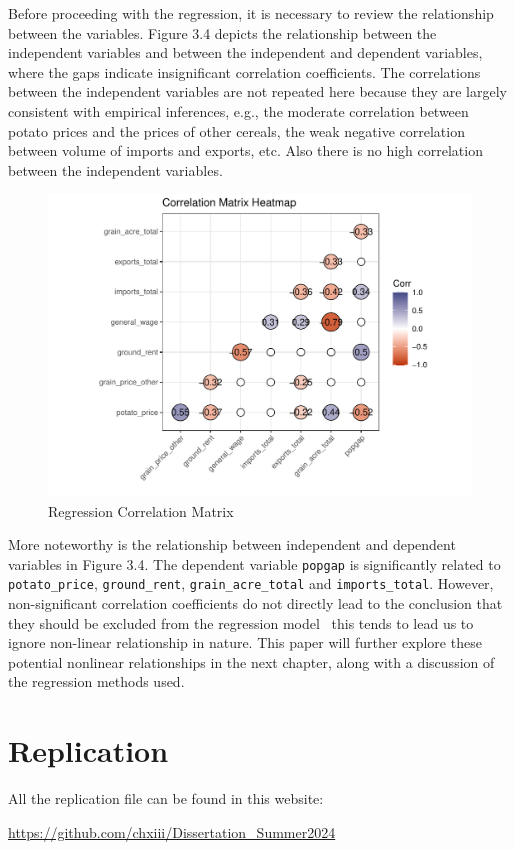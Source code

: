 Before proceeding with the regression, it is necessary to review the relationship between the variables. Figure 3.4 depicts the relationship between the independent variables and between the independent and dependent variables, where the gaps indicate insignificant correlation coefficients. The correlations between the independent variables are not repeated here because they are largely consistent with empirical inferences, e.g., the moderate correlation between potato prices and the prices of other cereals, the weak negative correlation between volume of imports and exports, etc. Also there is no high correlation between the independent variables.

\begin{figure}[htbp]
    \centering
    \caption{Regression Correlation Matrix}
    \includegraphics[width=.95\textwidth]{../03_outputs/corrmatrix.pdf}
\end{figure}

More noteworthy is the relationship between independent and dependent variables in Figure 3.4. The dependent variable \texttt{popgap} is significantly related  to \texttt{potato\_price}, \texttt{ground\_rent}, \texttt{grain\_acre\_total} and \texttt{imports\_total}. However, non-significant correlation coefficients do not directly lead to the conclusion that they should be excluded from the regression model \textemdash\ this tends to lead us to ignore non-linear relationship in nature. This paper will further explore these potential nonlinear relationships in the next chapter, along with a discussion of the regression methods used.

\section{Replication}
All the replication file can be found in this website:

\url{https://github.com/chxiii/Dissertation_Summer2024}